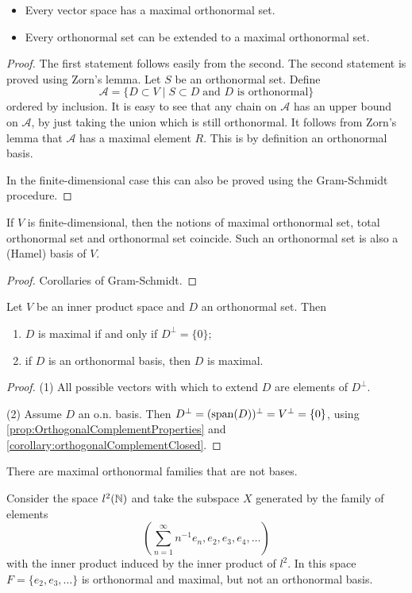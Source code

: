 \begin{proposition} \label{prop:exitenceMaximalOrthonormalSet}
\begin{itemize}
\item Every vector space has a maximal orthonormal set.
\item Every orthonormal set can be extended to a maximal orthonormal set.
\end{itemize}
\end{proposition}
\begin{proof}
The first statement follows easily from the second. The second statement is proved using Zorn's lemma. Let $S$ be an orthonormal set. Define
\[ \mathcal{A} = \{ D\subset V \;|\; S\subset D \; \text{and $D$ is orthonormal} \} \]
ordered by inclusion. It is easy to see that any chain on $\mathcal{A}$ has an upper bound on $\mathcal{A}$, by just taking the union which is still orthonormal. It follows from Zorn's lemma that $\mathcal{A}$ has a maximal element $R$. This is by definition an orthonormal basis.

In the finite-dimensional case this can also be proved using the Gram-Schmidt procedure.
\end{proof}

\begin{proposition}
If $V$ is finite-dimensional, then the notions of maximal orthonormal set, total orthonormal set and orthonormal set coincide. Such an orthonormal set is also a (Hamel) basis of $V$.
\end{proposition}
\begin{proof}
Corollaries of Gram-Schmidt.
\end{proof}

\begin{lemma} \label{lemma:characterisationMaximalOrthonormalSet}
Let $V$ be an inner product space and $D$ an orthonormal set. Then
\begin{enumerate}
\item $D$ is maximal \textup{if and only if} $D^\perp = \{0\}$;
\item if $D$ is an orthonormal basis, then $D$ is maximal.
\end{enumerate}
\end{lemma}
\begin{proof}
(1) All possible vectors with which to extend $D$ are elements of $D^\perp$. 

(2) Assume $D$ an o.n. basis. Then $D^\perp = (\operatorname{span}(D))^\perp = V^\perp = \{0\}$, using \ref{prop:OrthogonalComplementProperties} and \ref{corollary:orthogonalComplementClosed}.
\end{proof}
There are maximal orthonormal families that are not bases.
\begin{example}
Consider the space $l^2(\mathbb{N})$ and take the subspace $X$ generated by the family of elements
\[ \left( \sum_{n=1}^\infty n^{-1}e_n, e_2,e_3,e_4,\ldots \right) \]
with the inner product induced by the inner product of $l^2$. In this space $F=\{e_2,e_3,\ldots\}$ is orthonormal and maximal, but not an orthonormal basis.
\end{example}


